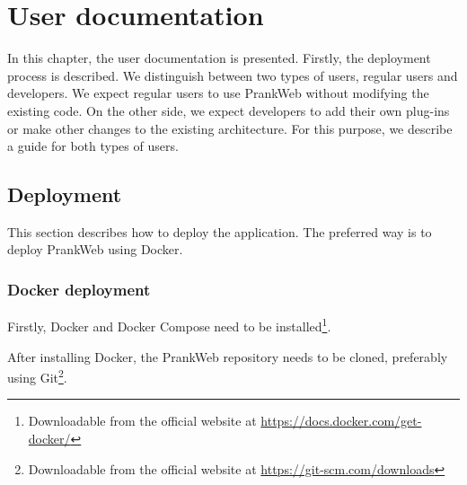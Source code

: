 \chapter{User documentation}
\label{chap:user_docs}

In this chapter, the user documentation is presented. Firstly, the deployment process is described. We distinguish between two types of users, regular users and developers. We expect regular users to use PrankWeb without modifying the existing code. On the other side, we expect developers to add their own plug-ins or make other changes to the existing architecture. For this purpose, we describe a guide for both types of users.

\section{Deployment}
\label{sec:deployment}

This section describes how to deploy the application. The preferred way is to deploy PrankWeb using Docker.

\subsection{Docker deployment}
\label{subsec:docker_deployment}

Firstly, Docker and Docker Compose need to be installed\footnote{Downloadable from the official website at \url{https://docs.docker.com/get-docker/}}. 

After installing Docker, the PrankWeb repository needs to be cloned, preferably using Git\footnote{Downloadable from the official website at \url{https://git-scm.com/downloads}}.

